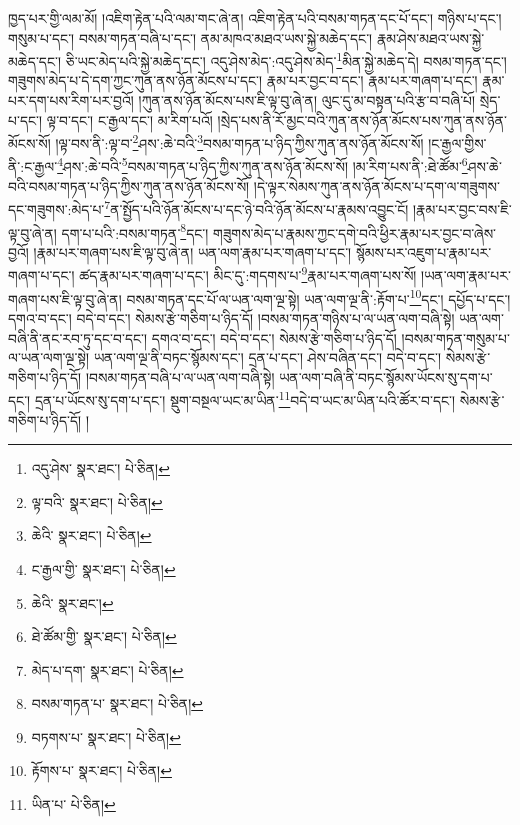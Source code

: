 ཁྱད་པར་གྱི་ལམ་མོ། །འཇིག་རྟེན་པའི་ལམ་གང་ཞེ་ན། འཇིག་རྟེན་པའི་བསམ་གཏན་དང་པོ་དང་། གཉིས་པ་དང་། གསུམ་པ་དང་། བསམ་གཏན་བཞི་པ་དང་། ནམ་མཁའ་མཐའ་ཡས་སྐྱེ་མཆེད་དང་། རྣམ་ཤེས་མཐའ་ཡས་སྐྱེ་མཆེད་དང་། ཅི་ཡང་མེད་པའི་སྐྱེ་མཆེད་དང་། འདུ་ཤེས་མེད་:འདུ་ཤེས་མེད་\footnote{འདུ་ཤེས་  སྣར་ཐང་།  པེ་ཅིན། }མིན་སྐྱེ་མཆེད་དེ། བསམ་གཏན་དང་། གཟུགས་མེད་པ་དེ་དག་ཀྱང་ཀུན་ནས་ཉོན་མོངས་པ་དང་། རྣམ་པར་བྱང་བ་དང་། རྣམ་པར་གཞག་པ་དང་། རྣམ་པར་དག་པས་རིག་པར་བྱའོ། །ཀུན་ནས་ཉོན་མོངས་པས་ཇི་ལྟ་བུ་ཞེ་ན། ལུང་དུ་མ་བསྟན་པའི་རྩ་བ་བཞི་པོ། སྲེད་པ་དང་། ལྟ་བ་དང་། ང་རྒྱལ་དང་། མ་རིག་པའོ། །སྲེད་པས་ནི་རོ་མྱང་བའི་ཀུན་ནས་ཉོན་མོངས་པས་ཀུན་ནས་ཉོན་མོངས་སོ། །ལྟ་བས་ནི་:ལྟ་བ་\footnote{ལྟ་བའི་  སྣར་ཐང་།  པེ་ཅིན། }ཤས་:ཆེ་བའི་\footnote{ཆེའི་  སྣར་ཐང་།  པེ་ཅིན། }བསམ་གཏན་པ་ཉིད་ཀྱིས་ཀུན་ནས་ཉོན་མོངས་སོ། །ང་རྒྱལ་གྱིས་ནི་:ང་རྒྱལ་\footnote{ང་རྒྱལ་གྱི་  སྣར་ཐང་།  པེ་ཅིན། }ཤས་:ཆེ་བའི་\footnote{ཆེའི་  སྣར་ཐང་། }བསམ་གཏན་པ་ཉིད་ཀྱིས་ཀུན་ནས་ཉོན་མོངས་སོ། །མ་རིག་པས་ནི་:ཐེ་ཚོམ་\footnote{ཐེ་ཚོམ་གྱི་  སྣར་ཐང་།  པེ་ཅིན། }ཤས་ཆེ་བའི་བསམ་གཏན་པ་ཉིད་ཀྱིས་ཀུན་ནས་ཉོན་མོངས་སོ། །དེ་ལྟར་སེམས་ཀུན་ནས་ཉོན་མོངས་པ་དག་ལ་གཟུགས་དང་གཟུགས་:མེད་པ་\footnote{མེད་པ་དག་  སྣར་ཐང་།  པེ་ཅིན། }ན་སྤྱོད་པའི་ཉོན་མོངས་པ་དང་ཉེ་བའི་ཉོན་མོངས་པ་རྣམས་འབྱུང་ངོ། །རྣམ་པར་བྱང་བས་ཇི་ལྟ་བུ་ཞེ་ན། དག་པ་པའི་:བསམ་གཏན་\footnote{བསམ་གཏན་པ་  སྣར་ཐང་།  པེ་ཅིན། }དང་། གཟུགས་མེད་པ་རྣམས་ཀྱང་དགེ་བའི་ཕྱིར་རྣམ་པར་བྱང་བ་ཞེས་བྱའོ། །རྣམ་པར་གཞག་པས་ཇི་ལྟ་བུ་ཞེ་ན། ཡན་ལག་རྣམ་པར་གཞག་པ་དང་། སྙོམས་པར་འཇུག་པ་རྣམ་པར་གཞག་པ་དང་། ཚད་རྣམ་པར་གཞག་པ་དང་། མིང་དུ་:གདགས་པ་\footnote{བཏགས་པ་  སྣར་ཐང་།  པེ་ཅིན། }རྣམ་པར་གཞག་པས་སོ། །ཡན་ལག་རྣམ་པར་གཞག་པས་ཇི་ལྟ་བུ་ཞེ་ན། བསམ་གཏན་དང་པོ་ལ་ཡན་ལག་ལྔ་སྟེ། ཡན་ལག་ལྔ་ནི་:རྟོག་པ་\footnote{རྟོགས་པ་  སྣར་ཐང་།  པེ་ཅིན། }དང་། དཔྱོད་པ་དང་། དགའ་བ་དང་། བདེ་བ་དང་། སེམས་རྩེ་གཅིག་པ་ཉིད་དོ། །བསམ་གཏན་གཉིས་པ་ལ་ཡན་ལག་བཞི་སྟེ། ཡན་ལག་བཞི་ནི་ནང་རབ་ཏུ་དང་བ་དང་། དགའ་བ་དང་། བདེ་བ་དང་། སེམས་རྩེ་གཅིག་པ་ཉིད་དོ། །བསམ་གཏན་གསུམ་པ་ལ་ཡན་ལག་ལྔ་སྟེ། ཡན་ལག་ལྔ་ནི་བཏང་སྙོམས་དང་། དྲན་པ་དང་། ཤེས་བཞིན་དང་། བདེ་བ་དང་། སེམས་རྩེ་གཅིག་པ་ཉིད་དོ། །བསམ་གཏན་བཞི་པ་ལ་ཡན་ལག་བཞི་སྟེ། ཡན་ལག་བཞི་ནི་བཏང་སྙོམས་ཡོངས་སུ་དག་པ་དང་། དྲན་པ་ཡོངས་སུ་དག་པ་དང་། སྡུག་བསྔལ་ཡང་མ་ཡིན་\footnote{ཡིན་པ་  པེ་ཅིན། }བདེ་བ་ཡང་མ་ཡིན་པའི་ཚོར་བ་དང་། སེམས་རྩེ་གཅིག་པ་ཉིད་དོ། །
